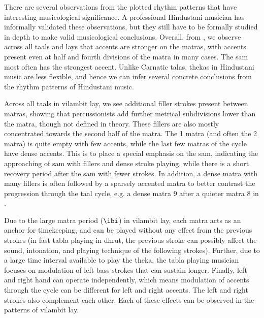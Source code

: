 There are several observations from the plotted rhythm patterns that have interesting musicological significance. A professional Hindustani musician has informally validated these observations, but they still have to be formally studied in depth to make valid musicological conclusions. Overall, from , we observe across all \glspl{taal} and \glspl{lay} that accents are stronger on the \glspl{matra}, with accents present even at half and fourth divisions of the matra in many cases. The \gls{sam} most often has the strongest accent. Unlike Carnatic \glspl{tala}, \glspl{theka} in Hindustani music are less flexible, and hence we can infer several concrete conclusions from the rhythm patterns of Hindustani music. 

Across all \glspl{taal} in \gls{vilambit} \gls{lay}, we see additional filler strokes present between \glspl{matra}, showing that percussionists add further metrical subdivisions lower than the \gls{matra}, though not defined in theory. These fillers are also mostly concentrated towards the second half of the \gls{matra}. The 1 \gls{matra} (and often the 2 \gls{matra}) is quite empty with few accents, while the last few \glspl{matra} of the cycle have dense accents. This is to place a special emphasis on the \gls{sam}, indicating the approaching of \gls{sam} with fillers and dense stroke playing, while there is a short recovery period after the \gls{sam} with fewer strokes. In addition, a dense matra with many fillers is often followed by a sparsely accented \gls{matra} to better contrast the progression through the \gls{taal} cycle, e.g. a dense \gls{matra} 9 after a quieter \gls{matra} 8 in . %

Due to the large \gls{matra} period ($\ibi$) in \gls{vilambit} \gls{lay}, each \gls{matra} acts as an anchor for timekeeping, and can be played without any effect from the previous strokes (in fast \gls{tabla} playing in \gls{dhrut}, the previous stroke can possibly affect the sound, intonation, and playing technique of the following strokes). Further, due to a large time interval available to play the \gls{theka}, the \gls{tabla} playing musician focuses on modulation of left bass strokes that can sustain longer. Finally, left and right hand can operate independently, which means modulation of accents through the cycle can be different for left and right accents. The left and right strokes also complement each other. Each of these effects can be observed in the patterns of \gls{vilambit} \gls{lay}. %

